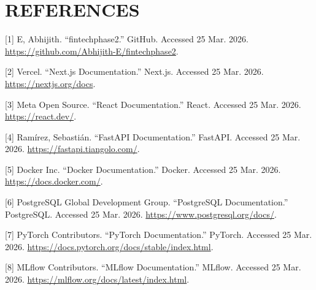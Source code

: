 \documentclass[12pt,a4paper]{report}
\begin{document}
\chapter*{REFERENCES}
[1] E, Abhijith. ``fintechphase2.'' GitHub. Accessed 25 Mar. 2026. \url{https://github.com/Abhijith-E/fintechphase2}.

[2] Vercel. ``Next.js Documentation.'' Next.js. Accessed 25 Mar. 2026. \url{https://nextjs.org/docs}.

[3] Meta Open Source. ``React Documentation.'' React. Accessed 25 Mar. 2026. \url{https://react.dev/}.

[4] Ram\'irez, Sebasti\'an. ``FastAPI Documentation.'' FastAPI. Accessed 25 Mar. 2026. \url{https://fastapi.tiangolo.com/}.

[5] Docker Inc. ``Docker Documentation.'' Docker. Accessed 25 Mar. 2026. \url{https://docs.docker.com/}.

[6] PostgreSQL Global Development Group. ``PostgreSQL Documentation.'' PostgreSQL. Accessed 25 Mar. 2026. \url{https://www.postgresql.org/docs/}.

[7] PyTorch Contributors. ``PyTorch Documentation.'' PyTorch. Accessed 25 Mar. 2026. \url{https://docs.pytorch.org/docs/stable/index.html}.

[8] MLflow Contributors. ``MLflow Documentation.'' MLflow. Accessed 25 Mar. 2026. \url{https://mlflow.org/docs/latest/index.html}.
\end{document}
